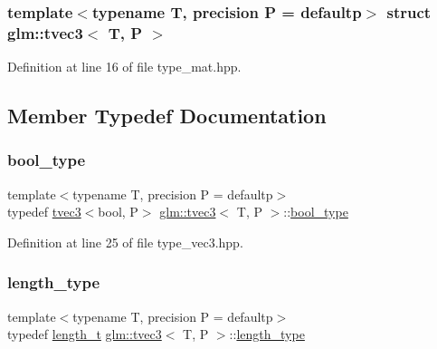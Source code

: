 \subsubsection*{template$<$typename T, precision P = defaultp$>$\newline
struct glm\+::tvec3$<$ T, P $>$}



Definition at line 16 of file type\+\_\+mat.\+hpp.



\subsection{Member Typedef Documentation}
\mbox{\label{structglm_1_1tvec3_a7d83af99df8b5a51688967cd08789917}} 
\subsubsection{\texorpdfstring{bool\_type}{bool\_type}}
{\footnotesize\ttfamily template$<$typename T, precision P = defaultp$>$ \\
typedef \mbox{\hyperlink{structglm_1_1tvec3}{tvec3}}$<$bool, P$>$ \mbox{\hyperlink{structglm_1_1tvec3}{glm\+::tvec3}}$<$ T, P $>$\+::\mbox{\hyperlink{structglm_1_1tvec3_a7d83af99df8b5a51688967cd08789917}{bool\+\_\+type}}}



Definition at line 25 of file type\+\_\+vec3.\+hpp.

\mbox{\label{structglm_1_1tvec3_a3a79c6a1cfc9fb8821a0a878fa2de91a}} 
\subsubsection{\texorpdfstring{length\_type}{length\_type}}
{\footnotesize\ttfamily template$<$typename T, precision P = defaultp$>$ \\
typedef \mbox{\hyperlink{namespaceglm_a090a0de2260835bee80e71a702492ed9}{length\+\_\+t}} \mbox{\hyperlink{structglm_1_1tvec3}{glm\+::tvec3}}$<$ T, P $>$\+::\mbox{\hyperlink{structglm_1_1tvec3_a3a79c6a1cfc9fb8821a0a878fa2de91a}{length\+\_\+type}}}



